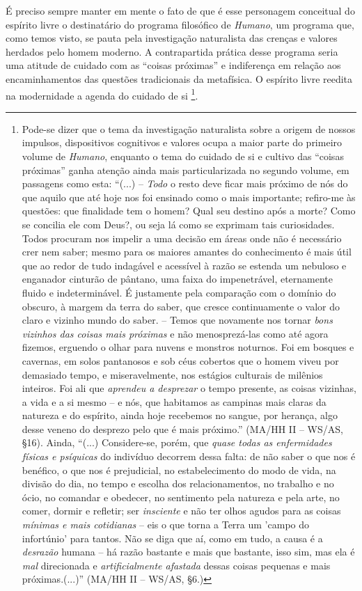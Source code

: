 \documentclass[
	12pt,				%
	openright,			%
	oneside,			%
	a4paper,			%
	english,			%
	french,				%
	spanish,			%
	brazil				%
	]{abntex2}
\begin{document}
É preciso sempre manter em mente o fato de que é esse personagem conceitual do espírito livre o destinatário do programa filosófico de \textit{Humano}, um programa que, como temos visto, se pauta pela investigação naturalista das crenças e valores herdados pelo homem moderno. A contrapartida prática desse programa seria uma atitude de cuidado com as “coisas próximas” e indiferença em relação aos encaminhamentos das questões tradicionais da metafísica. O espírito livre reedita na modernidade a agenda do cuidado de si
\footnote{Pode-se dizer que o tema da investigação naturalista sobre a origem de nossos impulsos, dispositivos cognitivos e valores ocupa a maior parte do primeiro volume de \textit{Humano}, enquanto o tema do cuidado de si e cultivo das “coisas próximas” ganha atenção ainda mais particularizada no segundo volume, em passagens como esta: “(...) – \textit{Todo} o resto deve ficar mais próximo de nós do que aquilo que até hoje nos foi ensinado como o mais importante; refiro-me às questões: que finalidade tem o homem? Qual seu destino após a morte? Como se concilia ele com Deus?, ou seja lá como se exprimam tais curiosidades. Todos procuram nos impelir a uma decisão em áreas onde não é necessário crer nem saber; mesmo para os maiores amantes do conhecimento é mais útil que ao redor de tudo indagável e acessível à razão se estenda um nebuloso e enganador cinturão de pântano, uma faixa do impenetrável, eternamente fluido e indeterminável. É justamente pela comparação com o domínio do obscuro, à margem da terra do saber, que cresce continuamente o valor do claro e vizinho mundo do saber. – Temos que novamente nos tornar \textit{bons vizinhos das coisas mais próximas} e não menosprezá-las como até agora fizemos, erguendo o olhar para nuvens e monstros noturnos. Foi em bosques e cavernas, em solos pantanosos e sob céus cobertos que o homem viveu por demasiado tempo, e miseravelmente, nos estágios culturais de milênios inteiros. Foi ali que \textit{aprendeu a desprezar} o tempo presente, as coisas vizinhas, a vida e a si mesmo – e nós, que habitamos as campinas mais claras da natureza e do espírito, ainda hoje recebemos no sangue, por herança, algo desse veneno do desprezo pelo que é mais próximo.” (MA/HH II – WS/AS, §16). Ainda, “(...) Considere-se, porém, que \textit{quase todas as enfermidades físicas e psíquicas} do indivíduo decorrem dessa falta: de não saber o que nos é benéfico, o que nos é prejudicial, no estabelecimento do modo de vida, na divisão do dia, no tempo e escolha dos relacionamentos, no trabalho e no ócio, no comandar e obedecer, no sentimento pela natureza e pela arte, no comer, dormir e refletir; ser \textit{insciente} e não ter olhos agudos para as coisas \textit{mínimas e mais cotidianas} – eis o que torna a Terra um 'campo do infortúnio' para tantos. Não se diga que aí, como em tudo, a causa é a \textit{desrazão} humana – há razão bastante e mais que bastante, isso sim, mas ela é \textit{mal} direcionada e \textit{artificialmente afastada} dessas coisas pequenas e mais próximas.(...)” (MA/HH II – WS/AS, §6.)}.
\end{document}
